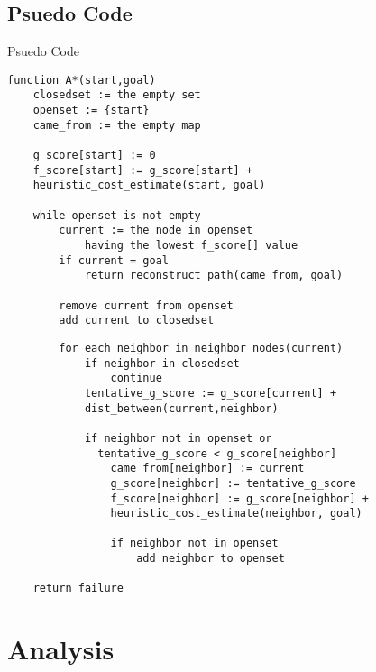 \documentclass{beamer}
\begin{document}
\subsection{Psuedo Code}
\begin{frame}[fragile]{Psuedo Code}
\begin{verbatim}
function A*(start,goal)
    closedset := the empty set   
    openset := {start}   
    came_from := the empty map 
 
    g_score[start] := 0 
    f_score[start] := g_score[start] + 
    heuristic_cost_estimate(start, goal)
 
    while openset is not empty
        current := the node in openset 
            having the lowest f_score[] value
        if current = goal
            return reconstruct_path(came_from, goal)
 
        remove current from openset
        add current to closedset
\end{verbatim}
\end{frame}

\begin{frame}[fragile]
\begin{verbatim}
        for each neighbor in neighbor_nodes(current)
            if neighbor in closedset
                continue
            tentative_g_score := g_score[current] + 
            dist_between(current,neighbor)
 
            if neighbor not in openset or 
              tentative_g_score < g_score[neighbor] 
                came_from[neighbor] := current
                g_score[neighbor] := tentative_g_score
                f_score[neighbor] := g_score[neighbor] + 
                heuristic_cost_estimate(neighbor, goal)
                
                if neighbor not in openset
                    add neighbor to openset
 
    return failure
\end{verbatim}
\end{frame}
\section{Analysis}
\end{document}
